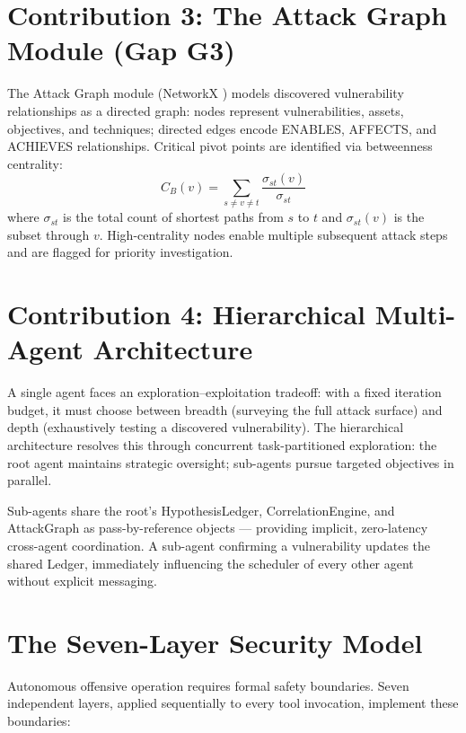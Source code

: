 \documentclass[12pt,a4paper,oneside,openany]{book}
\begin{document}
\section{Contribution 3: The Attack Graph Module (Gap G3)}
\label{sec:graph}

The Attack Graph module (NetworkX \cite{hagberg2008networkx}) models discovered vulnerability relationships as a directed graph: nodes represent vulnerabilities, assets, objectives, and techniques; directed edges encode ENABLES, AFFECTS, and ACHIEVES relationships. Critical pivot points are identified via betweenness centrality:
\begin{equation}
C_B(v) = \sum_{s \neq v \neq t} \frac{\sigma_{st}(v)}{\sigma_{st}}
\label{eq:centrality}
\end{equation}
where $\sigma_{st}$ is the total count of shortest paths from $s$ to $t$ and $\sigma_{st}(v)$ is the subset through $v$. High-centrality nodes enable multiple subsequent attack steps and are flagged for priority investigation.

\section{Contribution 4: Hierarchical Multi-Agent Architecture}
\label{sec:multiagent}

A single agent faces an exploration--exploitation tradeoff: with a fixed iteration budget, it must choose between breadth (surveying the full attack surface) and depth (exhaustively testing a discovered vulnerability). The hierarchical architecture resolves this through concurrent task-partitioned exploration: the root agent maintains strategic oversight; sub-agents pursue targeted objectives in parallel.

Sub-agents share the root's HypothesisLedger, CorrelationEngine, and AttackGraph as pass-by-reference objects --- providing implicit, zero-latency cross-agent coordination. A sub-agent confirming a vulnerability updates the shared Ledger, immediately influencing the scheduler of every other agent without explicit messaging.

\section{The Seven-Layer Security Model}
\label{sec:security}

Autonomous offensive operation requires formal safety boundaries. Seven independent layers, applied sequentially to every tool invocation, implement these boundaries:
\end{document}
